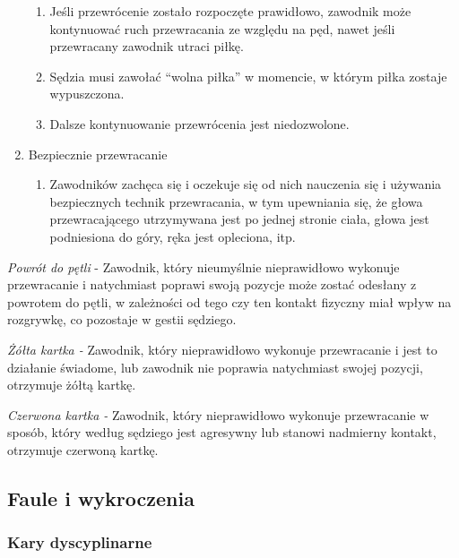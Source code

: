 \documentclass[12pt]{article}
\begin{document}
\begin{enumerate}
	      \begin{enumerate}
		      \item
		            Jeśli przewrócenie zostało rozpoczęte prawidłowo, zawodnik może
		            kontynuować ruch przewracania ze względu na pęd, nawet jeśli
		            przewracany zawodnik utraci piłkę.
		      \item
		            Sędzia musi zawołać ``wolna piłka'' w momencie, w którym piłka
		            zostaje wypuszczona.
		      \item
		            Dalsze kontynuowanie przewrócenia jest niedozwolone.
	      \end{enumerate}
	\item
	      Bezpiecznie przewracanie

	      \begin{enumerate}
		      \item
		            Zawodników zachęca się i oczekuje się od nich nauczenia się i
		            używania bezpiecznych technik przewracania, w tym upewniania się, że
		            głowa przewracającego utrzymywana jest po jednej stronie ciała,
		            głowa jest podniesiona do góry, ręka jest opleciona, itp.
	      \end{enumerate}
\end{enumerate}

\emph{Powrót do pętli} - Zawodnik, który nieumyślnie nieprawidłowo
wykonuje przewracanie i natychmiast poprawi swoją pozycje może zostać
odesłany z powrotem do pętli, w zależności od tego czy ten kontakt
fizyczny miał wpływ na rozgrywkę, co pozostaje w gestii sędziego.

\emph{Żółta kartka -} Zawodnik, który nieprawidłowo wykonuje
przewracanie i jest to działanie świadome, lub zawodnik nie poprawia
natychmiast swojej pozycji, otrzymuje żółtą kartkę.

\emph{Czerwona kartka -} Zawodnik, który nieprawidłowo wykonuje
przewracanie w sposób, który według sędziego jest agresywny lub stanowi
nadmierny kontakt, otrzymuje czerwoną kartkę.

\subsection{Faule i wykroczenia}

\subsubsection{Kary dyscyplinarne}
\end{document}
